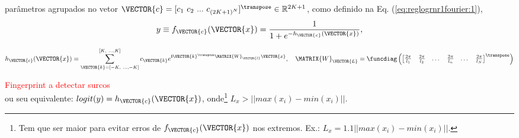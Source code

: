 \begin{theorem}
\begin{minipage}{0.55\textwidth}
parâmetros agrupados no vetor $\VECTOR{c}=[c_1~ c_2~ ...~ c_{{(2 K+1)}^N}]^{\transpose}\in \mathbb{R}^{2 K+1}$,
como definido na Eq. (\ref{eq:reglogrnr1fourier:1}),
\begin{equation}\label{eq:reglogrnr1fourier:1}
y\equiv f_{\VECTOR{c}}(\VECTOR{x})= \frac{1}{1+e^{-h_{\VECTOR{c}}(\VECTOR{x}) }},
\end{equation}
\end{minipage}

\begin{equation}
 h_{\VECTOR{c}}(\VECTOR{x}) = 
\sum_{\VECTOR{k}=[-K,~ ...,-K]}^{[K,~ ...,K]}
c_{\VECTOR{k}}  e^{\mathbf{i}\VECTOR{k}^{\transpose}\MATRIX{W}_{\VECTOR{l}}\VECTOR{x}},
\quad
\MATRIX{W}_{\VECTOR{L}}=
\funcdiag\left(
\begin{bmatrix}
\frac{2 \pi}{l_1} &
\frac{2 \pi}{l_2} &
\dots &
\frac{2 \pi}{l_n} &
\dots &
\frac{2 \pi}{l_N}
\end{bmatrix}^{\transpose}
\right) 
\end{equation}

\textcolor{red}{Fingerprint a detectar surcos}\\
ou seu equivalente: $logit(y)=h_{\VECTOR{c}}(\VECTOR{x})$, onde\footnote{Tem 
que ser maior para evitar erros de $f_{\VECTOR{c}}(\VECTOR{x})$ nos extremos. 
Ex.: $L_x =1.1 || max(x_i)-min(x_i)||$.}
 $L_x > || max(x_i)-min(x_i)||$.


\end{theorem}
